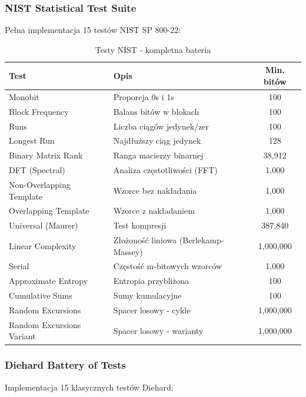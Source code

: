 \documentclass[12pt,a4paper]{article}
\begin{document}
\subsubsection{NIST Statistical Test Suite}

Pełna implementacja 15 testów NIST SP 800-22:

\begin{table}[H]
\centering
\caption{Testy NIST - kompletna bateria}
\begin{tabular}{|l|p{6cm}|c|}
\hline
\textbf{Test} & \textbf{Opis} & \textbf{Min. bitów} \\
\hline
Monobit & Proporcja 0s i 1s & 100 \\
\hline
Block Frequency & Balans bitów w blokach & 100 \\
\hline
Runs & Liczba ciągów jedynek/zer & 100 \\
\hline
Longest Run & Najdłuższy ciąg jedynek & 128 \\
\hline
Binary Matrix Rank & Ranga macierzy binarnej & 38,912 \\
\hline
DFT (Spectral) & Analiza częstotliwości (FFT) & 1,000 \\
\hline
Non-Overlapping Template & Wzorce bez nakładania & 1,000 \\
\hline
Overlapping Template & Wzorce z nakładaniem & 1,000 \\
\hline
Universal (Maurer) & Test kompresji & 387,840 \\
\hline
Linear Complexity & Złożoność liniowa (Berlekamp-Massey) & 1,000,000 \\
\hline
Serial & Częstość m-bitowych wzorców & 1,000 \\
\hline
Approximate Entropy & Entropia przybliżona & 100 \\
\hline
Cumulative Sums & Sumy kumulacyjne & 100 \\
\hline
Random Excursions & Spacer losowy - cykle & 1,000,000 \\
\hline
Random Excursions Variant & Spacer losowy - warianty & 1,000,000 \\
\hline
\end{tabular}
\end{table}

\subsubsection{Diehard Battery of Tests}

Implementacja 15 klasycznych testów Diehard:
\end{document}
